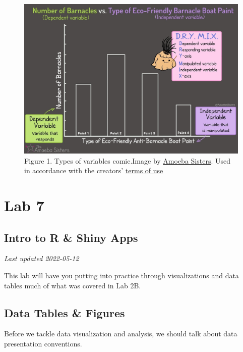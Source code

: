 \documentclass[
]{book}
\begin{document}
\begin{figure}
\centering
\includegraphics{figures_images/Lab6-Fig1.jpg}
\caption{Figure 1. Types of variables comic.Image by \href{https://www.amoebasisters.com/parameciumparlorcomics/category/nature-of-science/2}{Amoeba Sisters}. Used in accordance with the creators' \href{https://www.amoebasisters.com/termsofuse.html}{terms of use}}
\end{figure}

\hypertarget{part-lab-7}{%
\part*{Lab 7}\label{part-lab-7}}

\hypertarget{intro-to-r-shiny-apps}{%
\chapter*{Intro to R \& Shiny Apps}\label{intro-to-r-shiny-apps}}

\emph{Last updated 2022-05-12}

This lab will have you putting into practice through visualizations and data tables much of what was covered in Lab 2B.

\hypertarget{data-tables-figures}{%
\chapter*{Data Tables \& Figures}\label{data-tables-figures}}

Before we tackle data visualization and analysis, we should talk about data presentation conventions.
\end{document}
